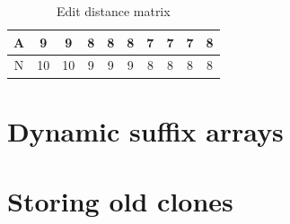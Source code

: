 \begin{table}
\begin{center}
\begin{tabular}[c]{c|c|c|c|c|c|c|c|c|c|}
			A & 9                    & 9                    & 8                    & 8                    & 8                    & 7                    & 7                    & \cellcolor{blue!25}7 & 8                    \\\hline
			N & 10                   & 10                   & 9                    & 9                    & 9                    & 8                    & 8                    & 8                    & \cellcolor{blue!25}8 \\\hline

			\hline
		\end{tabular}
	\end{center}
	\caption{Edit distance matrix}
	\label{table:wagnerfischermatrix}
\end{table}




\section{Dynamic suffix arrays}

\section{Storing old clones}
